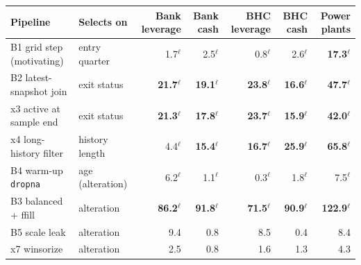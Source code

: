 \begin{tabular}{llrrrrr}
\toprule
Pipeline & Selects on & Bank leverage & Bank cash & BHC leverage & BHC cash & Power plants \\
\midrule
B1 grid step (motivating) & entry quarter & 1.7$^{\ell}$ & 2.5$^{\ell}$ & 0.8$^{\ell}$ & 2.6$^{\ell}$ & \textbf{17.3}$^{\ell}$ \\
B2 latest-snapshot join & exit status & \textbf{21.7}$^{\ell}$ & \textbf{19.1}$^{\ell}$ & \textbf{23.8}$^{\ell}$ & \textbf{16.6}$^{\ell}$ & \textbf{47.7}$^{\ell}$ \\
x3 active at sample end & exit status & \textbf{21.3}$^{\ell}$ & \textbf{17.8}$^{\ell}$ & \textbf{23.7}$^{\ell}$ & \textbf{15.9}$^{\ell}$ & \textbf{42.0}$^{\ell}$ \\
x4 long-history filter & history length & 4.4$^{\ell}$ & \textbf{15.4}$^{\ell}$ & \textbf{16.7}$^{\ell}$ & \textbf{25.9}$^{\ell}$ & \textbf{65.8}$^{\ell}$ \\
B4 warm-up \texttt{dropna} & age (alteration) & 6.2$^{\ell}$ & 1.1$^{\ell}$ & 0.3$^{\ell}$ & 1.8$^{\ell}$ & 7.5$^{\ell}$ \\
B3 balanced + ffill & alteration & \textbf{86.2}$^{\ell}$ & \textbf{91.8}$^{\ell}$ & \textbf{71.5}$^{\ell}$ & \textbf{90.9}$^{\ell}$ & \textbf{122.9}$^{\ell}$ \\
B5 scale leak & alteration & 9.4 & 0.8 & 8.5 & 0.4 & 8.4 \\
x7 winsorize & alteration & 2.5 & 0.8 & 1.6 & 1.3 & 4.3 \\
\bottomrule
\end{tabular}
